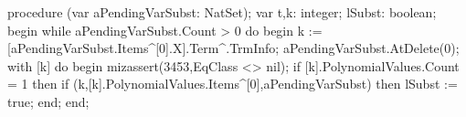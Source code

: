 \nwenddocs{}\endmoddef\nwstartdeflinemarkup{}\nwenddeflinemarkup
procedure (var aPendingVarSubst: NatSet);
var
   t,k: integer;
   lSubst: boolean;
begin
   while aPendingVarSubst.Count > 0 do
   begin
      k := [aPendingVarSubst.Items^[0].X].Term^.TrmInfo;
      aPendingVarSubst.AtDelete(0);
      with [k] do
      begin
         mizassert(3453,EqClass <> nil);
         if [k].PolynomialValues.Count = 1 then
            if (k,[k].PolynomialValues.Items^[0],aPendingVarSubst) then
               lSubst := true;
      end;
   end;
   
